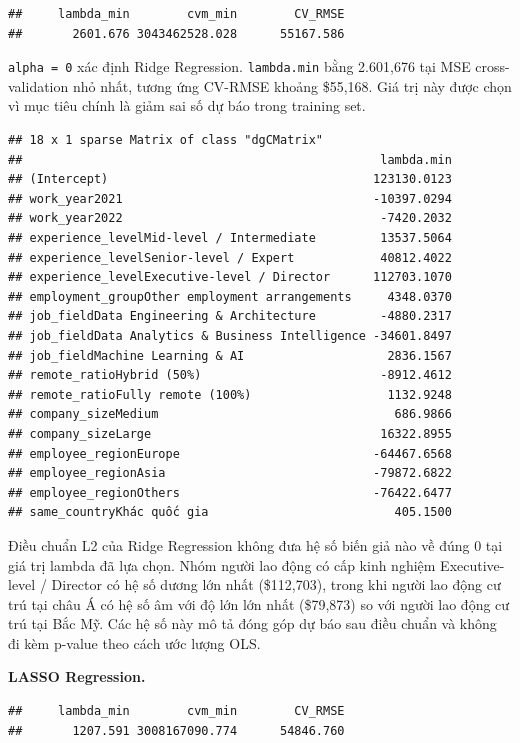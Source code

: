 \begin{verbatim}
##     lambda_min        cvm_min        CV_RMSE 
##       2601.676 3043462528.028      55167.586
\end{verbatim}

\texttt{alpha\ =\ 0} xác định Ridge Regression. \texttt{lambda.min} bằng
2.601,676 tại MSE cross-validation nhỏ nhất, tương ứng CV-RMSE khoảng
\$55,168. Giá trị này được chọn vì mục tiêu chính là giảm sai số dự báo
trong training set.

\begin{verbatim}
## 18 x 1 sparse Matrix of class "dgCMatrix"
##                                                  lambda.min
## (Intercept)                                     123130.0123
## work_year2021                                   -10397.0294
## work_year2022                                    -7420.2032
## experience_levelMid-level / Intermediate         13537.5064
## experience_levelSenior-level / Expert            40812.4022
## experience_levelExecutive-level / Director      112703.1070
## employment_groupOther employment arrangements     4348.0370
## job_fieldData Engineering & Architecture         -4880.2317
## job_fieldData Analytics & Business Intelligence -34601.8497
## job_fieldMachine Learning & AI                    2836.1567
## remote_ratioHybrid (50%)                         -8912.4612
## remote_ratioFully remote (100%)                   1132.9248
## company_sizeMedium                                 686.9866
## company_sizeLarge                                16322.8955
## employee_regionEurope                           -64467.6568
## employee_regionAsia                             -79872.6822
## employee_regionOthers                           -76422.6477
## same_countryKhác quốc gia                          405.1500
\end{verbatim}

Điều chuẩn L2 của Ridge Regression không đưa hệ số biến giả nào về đúng
0 tại giá trị lambda đã lựa chọn. Nhóm người lao động có cấp kinh nghiệm
Executive-level / Director có hệ số dương lớn nhất (\$112,703), trong
khi người lao động cư trú tại châu Á có hệ số âm với độ lớn lớn nhất
(\$79,873) so với người lao động cư trú tại Bắc Mỹ. Các hệ số này mô tả
đóng góp dự báo sau điều chuẩn và không đi kèm p-value theo cách ước
lượng OLS.

\textbf{LASSO Regression.}

\begin{verbatim}
##     lambda_min        cvm_min        CV_RMSE 
##       1207.591 3008167090.774      54846.760
\end{verbatim}

